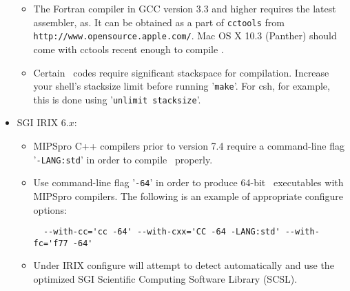 \documentclass[12pt]{article}
\begin{document}
\begin{itemize}
\begin{itemize}
   \item The Fortran compiler in GCC version 3.3 and higher requires the latest
   assembler, as. It can be obtained as a part of {\tt cctools} from 
   {\tt http://www.opensource.apple.com/}.  Mac OS X 10.3 (Panther) should come 
   with cctools recent enough to compile \PSIthree.

   \item Certain \PSIthree\ codes require significant stackspace for compilation.
   Increase your shell's stacksize limit before running '{\tt make}'.  For csh,
   for example, this is done using '{\tt unlimit stacksize}'.
  \end{itemize}

\item SGI IRIX 6.$x$:
  \begin{itemize}
   \item MIPSpro C++ compilers prior to version 7.4 require a command-line flag
   '{\tt -LANG:std}' in order to compile \PSIthree\ properly.

   \item Use command-line flag '{\tt -64}' in order to produce 64-bit \PSIthree\ executables with
   MIPSpro compilers. The following is an example of appropriate configure options:
   \begin{verbatim}
  --with-cc='cc -64' --with-cxx='CC -64 -LANG:std' --with-fc='f77 -64'
   \end{verbatim}

   \item Under IRIX configure will attempt to detect automatically and use
   the optimized SGI Scientific Computing Software Library (SCSL).
  \end{itemize}

\end{itemize}
\end{document}
